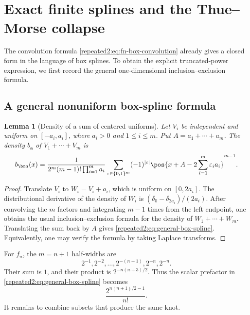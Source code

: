 \documentclass[11pt,oneside]{article}
\newtheorem{lemma}[lemma]{Lemma}
\theoremstyle{definition}
\theoremstyle{remark}
\begin{document}
\section{Exact finite splines and the Thue--Morse collapse}
\label{repeated2:sec:exact-spline}

The convolution formula \eqref{repeated2:eq:fn-box-convolution} already gives a closed form in the
language of box splines.  To obtain the explicit truncated-power expression, we first
record the general one-dimensional inclusion--exclusion formula.

\subsection{A general nonuniform box-spline formula}

\begin{lemma}[Density of a sum of centered uniforms]
\label{repeated2:lem:general-box-spline}
Let $V_i$ be independent and uniform on $[-a_i,a_i]$, where $a_i>0$ and
$1\le i\le m$.  Put $A=a_1+\cdots+a_m$.  The density $b_{\bm a}$ of
$V_1+\cdots+V_m$ is
\begin{equation}
 b_{\bm a}(x)=
 \frac{1}{2^m(m-1)!\prod_{i=1}^{m}a_i}
 \sum_{\varepsilon\in\{0,1\}^m}(-1)^{|\varepsilon|}
 \pos{x+A-2\sum_{i=1}^{m}\varepsilon_i a_i}^{m-1}.
 \label{repeated2:eq:general-box-spline}
\end{equation}
\end{lemma}

\begin{proof}
Translate $V_i$ to $W_i=V_i+a_i$, which is uniform on $[0,2a_i]$.  The distributional
derivative of the density of $W_i$ is
$(\delta_0-\delta_{2a_i})/(2a_i)$.  After convolving the $m$ factors and integrating
$m-1$ times from the left endpoint, one obtains the usual inclusion--exclusion formula
for the density of $W_1+\cdots+W_m$.  Translating the sum back by $A$ gives
\eqref{repeated2:eq:general-box-spline}.  Equivalently, one may verify the formula by taking
Laplace transforms.
\end{proof}

For $f_n$, the $m=n+1$ half-widths are
\begin{equation}
 2^{-1},2^{-2},\ldots,2^{-(n-1)},2^{-n},2^{-n}.
 \label{repeated2:eq:fn-halfwidths}
\end{equation}
Their sum is $1$, and their product is $2^{-n(n+3)/2}$.  Thus the scalar prefactor in
\eqref{repeated2:eq:general-box-spline} becomes
\begin{equation}
 \frac{2^{n(n+1)/2-1}}{n!}.
 \label{repeated2:eq:box-prefactor}
\end{equation}
It remains to combine subsets that produce the same knot.
\end{document}
